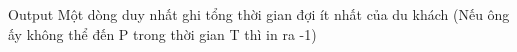 Output
Một dòng duy nhất ghi tổng thời gian đợi ít nhất của du khách (Nếu ông ấy không thể đến P trong thời gian T thì in ra -1)